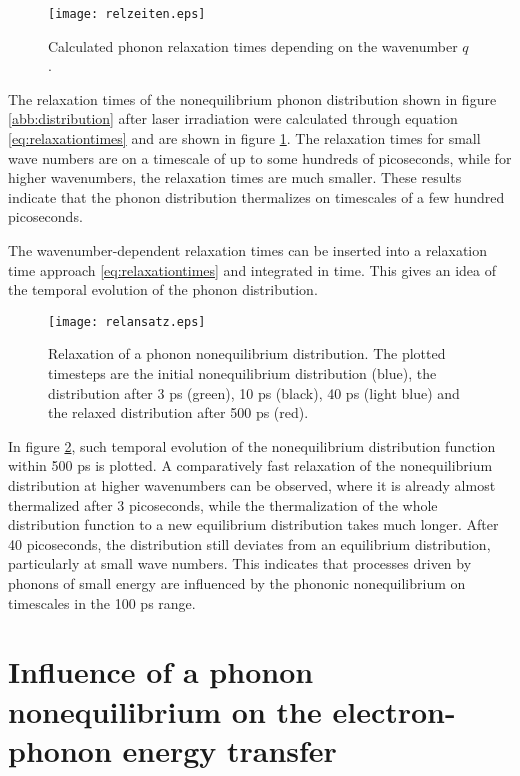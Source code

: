 \documentclass[ aps, prb, reprint, groupedaddress]{revtex4-1}
\begin{document}
\begin{figure}[!h]
\texttt{[image: relzeiten.eps]} %
\caption{Calculated phonon relaxation times depending on the wavenumber $q$.}
\label{abb:rel}
\end{figure}

The relaxation times of the nonequilibrium phonon distribution shown in figure \ref{abb:distribution} after laser irradiation were calculated through equation \eqref{eq:relaxationtimes} and are shown in figure 
\ref{abb:rel}. 
The relaxation times for small wave numbers are on a timescale of up to
some hundreds of picoseconds, while for higher wavenumbers, the relaxation times are much smaller. These results indicate that the phonon distribution thermalizes on timescales of a few hundred picoseconds.

The wavenumber-dependent relaxation times can be inserted into a relaxation time approach \eqref{eq:relaxationtimes} and integrated in time. This gives an idea of the temporal evolution of the phonon distribution.

\begin{figure}[!h]
\texttt{[image: relansatz.eps]} %
\caption{Relaxation of a phonon nonequilibrium distribution. The plotted timesteps are the initial nonequilibrium distribution (blue), the distribution after 3 ps (green), 10 ps (black), 40 ps (light blue) and
the relaxed distribution after 500 ps (red).}
\label{abb:relaxation}
\end{figure}

In figure \ref{abb:relaxation}, such temporal evolution of the nonequilibrium distribution function within 500 ps is plotted. A comparatively fast relaxation of the 
nonequilibrium distribution at higher wavenumbers can be observed, where it is 
already almost thermalized after 3 picoseconds,
while the thermalization of the whole distribution function to a new equilibrium distribution takes much longer. After 40 picoseconds, the distribution still deviates from an equilibrium distribution, particularly at 
small wave numbers.
This indicates that processes driven by phonons of small energy are influenced by the phononic nonequilibrium on timescales in the 100 ps range.



\section{Influence of a phonon nonequilibrium on the electron-phonon energy transfer}
\end{document}
